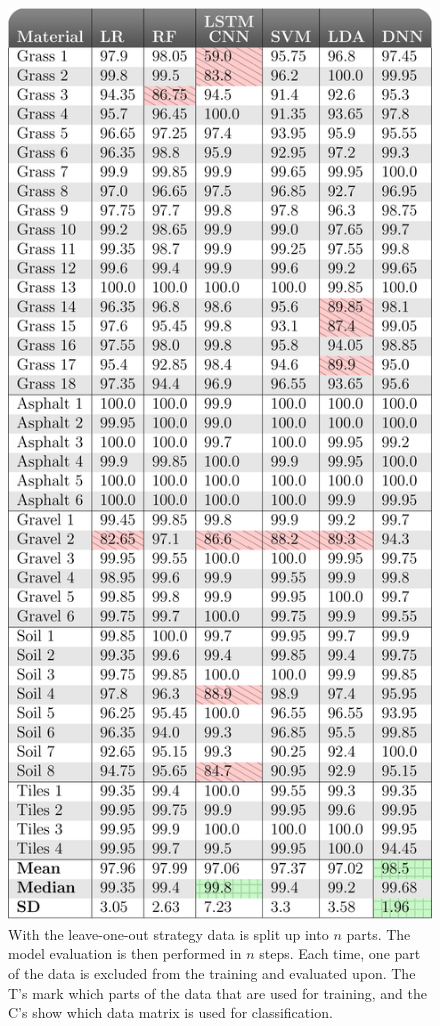 \begin{figure}[h]
	\label{fig:loo}
	\centering
	\includegraphics[scale=0.5]{figs_temp/loo_table.jpg}
	\caption{With the leave-one-out strategy data is split up into $n$ parts. The model evaluation is then performed in $n$ steps. Each time, one part of the data is excluded from the training and evaluated upon. The T's mark which parts of the data that are used for training, and the C's show which data matrix is used for classification.}
\end{figure}

